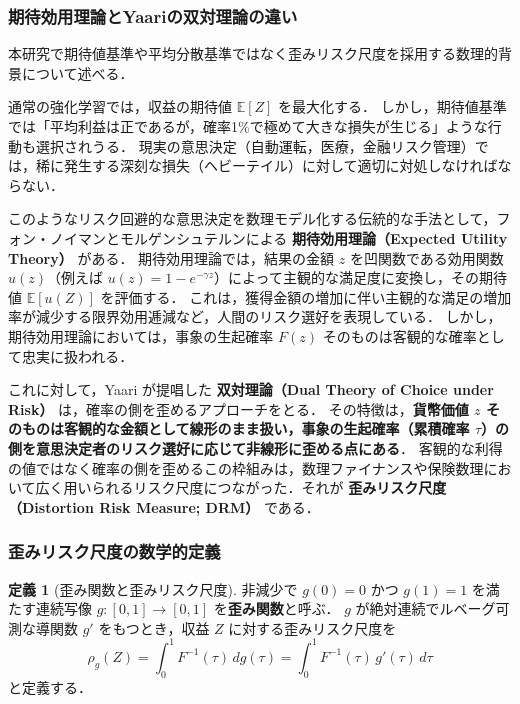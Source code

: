 \documentclass[a4paper,10pt]{jsarticle}
\theoremstyle{definition}
\newtheorem{definition}{定義}[section]
\renewcommand{\Finv}{F^{-1}}
\newcommand{\E}{\mathbb{E}}
\begin{document}
\subsubsection{期待効用理論とYaariの双対理論の違い}
本研究で期待値基準や平均分散基準ではなく歪みリスク尺度を採用する数理的背景について述べる．

通常の強化学習では，収益の期待値 $\E[Z]$ を最大化する．
しかし，期待値基準では「平均利益は正であるが，確率1\%で極めて大きな損失が生じる」ような行動も選択されうる．
現実の意思決定（自動運転，医療，金融リスク管理）では，稀に発生する深刻な損失（ヘビーテイル）に対して適切に対処しなければならない．

このようなリスク回避的な意思決定を数理モデル化する伝統的な手法として，フォン・ノイマンとモルゲンシュテルンによる \textbf{期待効用理論（Expected Utility Theory）} がある．
期待効用理論では，結果の金額 $z$ を凹関数である効用関数 $u(z)$（例えば $u(z) = 1 - e^{-\gamma z}$）によって主観的な満足度に変換し，その期待値 $\E[u(Z)]$ を評価する．
これは，獲得金額の増加に伴い主観的な満足の増加率が減少する限界効用逓減など，人間のリスク選好を表現している．
しかし，期待効用理論においては，事象の生起確率 $F(z)$ そのものは客観的な確率として忠実に扱われる．

これに対して，Yaari \cite{yaari1987dual} が提唱した \textbf{双対理論（Dual Theory of Choice under Risk）} は，確率の側を歪めるアプローチをとる．
その特徴は，\textbf{貨幣価値 $z$ そのものは客観的な金額として線形のまま扱い，事象の生起確率（累積確率 $\tau$）の側を意思決定者のリスク選好に応じて非線形に歪める点にある}．
客観的な利得の値ではなく確率の側を歪めるこの枠組みは，数理ファイナンスや保険数理において広く用いられるリスク尺度につながった．それが \textbf{歪みリスク尺度（Distortion Risk Measure; DRM）} である．

\subsubsection{歪みリスク尺度の数学的定義}
\begin{definition}[歪み関数と歪みリスク尺度]
\label{def:drm}
非減少で $g(0)=0$ かつ $g(1)=1$ を満たす連続写像 $g:[0,1]\to[0,1]$ を\textbf{歪み関数}と呼ぶ．
$g$ が絶対連続でルベーグ可測な導関数 $g'$ をもつとき，収益 $Z$ に対する歪みリスク尺度を
\begin{equation}
  \rho_g(Z) = \int_0^1 \Finv(\tau)\,dg(\tau) = \int_0^1 \Finv(\tau)\,g'(\tau)\,d\tau
  \label{eq:drm}
\end{equation}
と定義する．
\end{definition}
\end{document}
